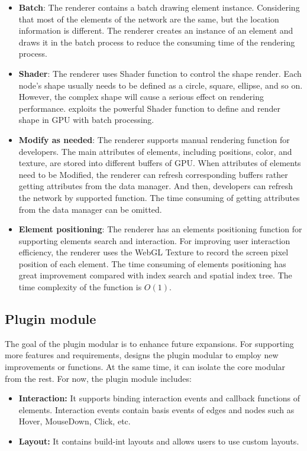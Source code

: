 \begin{itemize}
\item \textbf{Batch}: The renderer contains a batch drawing element instance. Considering that most of the elements of the network are the same, but the location information is different. The renderer creates an instance of an element and draws it in the batch process to reduce the consuming time of the rendering process.

\item \textbf{Shader}: The renderer uses Shader function to control the shape render. Each node's shape usually needs to be defined as a circle, square, ellipse, and so on. However, the complex shape will cause a serious effect on rendering performance.
\name exploits the powerful Shader function to define and render shape in GPU with batch processing.

\item \textbf{Modify as needed}: The renderer supports manual rendering function for developers.
The main attributes of elements, including positions, color, and texture, are stored into different buffers of GPU.
When attributes of elements need to be Modified, the renderer can refresh corresponding buffers rather getting attributes from the data manager. And then, developers can refresh the network by supported function. The time consuming of getting attributes from the data manager can be omitted.

\item \textbf{Element positioning}: The renderer has an elements positioning function for supporting elements search and interaction. For improving user interaction efficiency, the renderer uses the WebGL Texture to record the screen pixel position of each element.
The time consuming of elements positioning has great improvement compared with index search and spatial index tree.
The time complexity of the function is $O(1)$.

\end{itemize}

\subsection{Plugin module}
The goal of the plugin modular is to enhance future expansions.
For supporting more features and requirements, \name designs the plugin modular to employ new improvements or functions.
At the same time, it can isolate the core modular from the rest.
For now, the plugin module includes:
\begin{itemize}
    \item \textbf{Interaction: } It supports binding interaction events and callback functions of elements. Interaction events contain basis events of edges and nodes such as Hover, MouseDown, Click, etc.
    \item \textbf{Layout: } It contains build-int layouts and allows users to use custom layouts.

\end{itemize}

